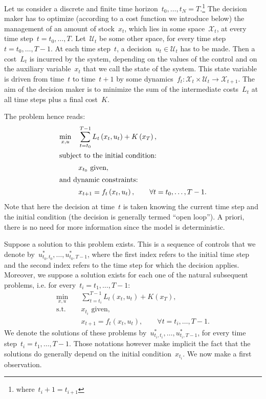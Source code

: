 \documentclass[a4paper]{amsart}
\theoremstyle{plain}
\theoremstyle{definition}
\theoremstyle{remark}
\begin{document}
Let us consider a discrete and finite time
horizon~$t_0,\dots,t_N=T$.\footnote{where~$t_i+1=t_{i+1}$} The
decision maker has to optimize (according to a cost function we
introduce below) the management of an amount of stock~$x_t$, which
lies in some space~$\mathcal{X}_t$, at every time step~$t=t_0,
\dots, T$. Let~$\mathcal{U}_t$ be some other space, for every time
step~$t=t_0, \dots, T-1$. At each time step~$t$, a decision~$u_t
\in \mathcal{U}_t$ has to be made. Then a cost~$L_t$ is incurred
by the system, depending on the values of the control and on the
auxiliary variable~$x_t$ that we call the state of the system.
This state variable is driven from time~$t$ to time~$t+1$ by some
dynamics~$f_t: \mathcal{X}_t \times \mathcal{U}_t \rightarrow
\mathcal{X}_{t+1}$. The aim of the decision maker is to minimize
the sum of the intermediate costs~$L_t$ at all time steps plus a
final cost~$K$.

The problem hence reads:
\begin{subequations} \label{eqn:P}
\begin{align}
\min_{x, u} \quad & \sum_{t=t_0}^{T-1} L_t\left(x_t, u_t\right)
    + K\left(x_T\right), \\
\intertext{subject to the initial condition:}
    & x_{t_0} \text{ given}, \\
\intertext{and dynamic constraints:}
    & x_{t+1} = f_t\left(x_t, u_t\right), \qquad \forall t=t_0, \dots, T-1.
\end{align}
\end{subequations}
Note that here the decision at time~$t$ is taken knowing the
current time step and the initial condition (the decision is
generally termed ``open loop''). A priori, there is no need for
more information since the model is deterministic.

Suppose a solution to this problem exists. This is a sequence of
controls that we denote by~$u_{t_0,t_0}^*, \dots, u_{t_0,T-1}^*$,
where the first index refers to the initial time step and the
second index refers to the time step for which the decision
applies. Moreover, we suppose a solution exists for each one of
the natural subsequent problems, i.e. for every~$t_i=t_1, \dots,
T-1$:
\begin{subequations} \label{eqn:Pti}
\begin{align}
\min_{x, u} \quad& \sum_{t=t_i}^{T-1} L_t\left(x_t, u_t\right) + K\left(x_T\right), \\
\text{s.t.} \quad& x_{t_i} \text{ given}, \\
& x_{t+1} = f_t\left(x_t, u_t\right), \qquad \forall t=t_i, \dots,
T-1.
\end{align}
\end{subequations}
We denote the solutions of these problems
by~$u_{t_i,t_i}^*,\dots,u_{t_i,T-1}^*$, for every time step~$t_i=t_1, \dots,
T-1$. Those notations however make implicit the fact that the
solutions do generally depend on the initial condition~$x_{t_i}$.
We now make a first observation.
\end{document}
